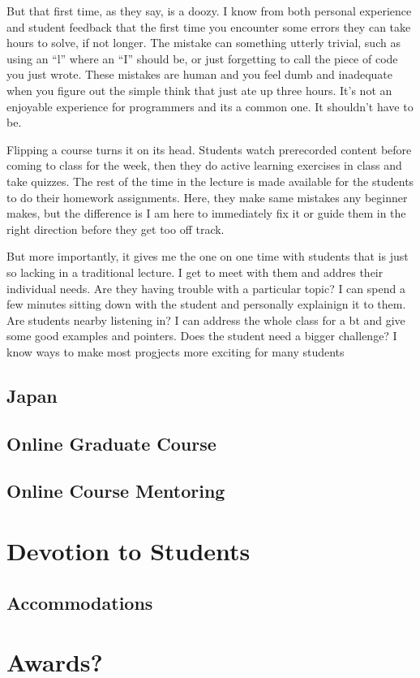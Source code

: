 \documentclass[]{article}
\begin{document}
But that first time, as they say, is a doozy.  
I know from both personal experience  and student feedback that the first time you encounter some errors they can take hours to solve, if not longer.  
The mistake can  something utterly trivial, such as using an ``l'' where an ``I'' should be, or just forgetting to call the piece of code you just wrote.
These mistakes are human and you feel dumb and inadequate when you figure out the simple think that just ate up three hours.
It's not an enjoyable experience for programmers and its a common one.  It shouldn't have to be.

Flipping a course turns it on its head.  
Students watch prerecorded content before coming to class for the week, then they do active learning exercises in class and take quizzes.  The rest of the time in the lecture is made available for the students to do their homework assignments.  Here, they make same mistakes any beginner makes, but the difference is I am here to immediately fix it or guide them in the right direction before they get too off track.


But more importantly, it gives me the one on one time with students that is just so lacking in a traditional lecture.  
I get to meet with them and addres their individual needs.
Are they having trouble with a particular topic? I can spend a few minutes sitting down with the student and personally explainign it to them.  Are students nearby listening in?  I can address the whole class for a bt and give some good examples and pointers.  Does the student need a bigger challenge? I know ways to make most progjects more exciting for many students




\subsection{Japan}

\subsection{Online Graduate Course}

\subsection{Online Course Mentoring}

\section{Devotion to Students}


\subsection{Accommodations}


\section{Awards?}
\end{document}
